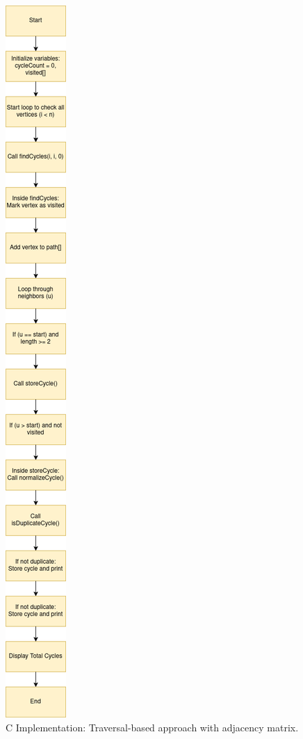 \documentclass{sbc2023}%
\begin{document}
\begin{figure}[H] %
    \centering
    \includegraphics[width=0.2\columnwidth]{Caminhamento.png}  
    \caption{C Implementation: Traversal-based approach with adjacency matrix.}
    \label{fig:c_impl}
\end{figure}
\end{document}
